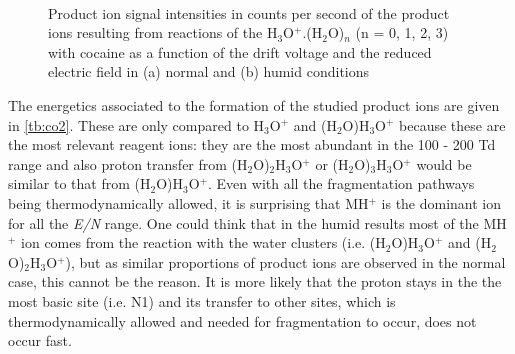  
\begin{figure}[htbp]
\centering
{}\\
\caption{Product ion signal intensities in counts per second of the product ions resulting from reactions of the H$_3$O$^+$.(H$_2$O)$_n$ (n = 0, 1, 2, 3) with cocaine as a function of the drift voltage and the reduced electric field in (a) normal and (b) humid conditions}
\label{fig:cocaineEN}
\end{figure}

The energetics associated to the formation of the studied product ions are given in \autoref{tb:co2}. 
%
These are only compared to H$_3$O$^+$ and (H$_2$O)H$_3$O$^+$ because these are the most relevant reagent ions: they are the most abundant in the 100 - 200 Td range and also proton transfer from (H$_2$O)$_2$H$_3$O$^+$ or (H$_2$O)$_3$H$_3$O$^+$ would be similar to that from (H$_2$O)H$_3$O$^+$.
%
Even with all the fragmentation pathways being thermodynamically allowed, it is surprising that MH$^+$ is the dominant ion for all the \textit{E/N} range.
%
One could think that in the humid results most of the MH$^+$ ion comes from the reaction with the water clusters (i.e. (H$_2$O)H$_3$O$^+$ and (H$_2$O)$_2$H$_3$O$^+$), but as similar proportions of product ions are observed in the normal case, this cannot be the reason.
%
It is more likely that the proton stays in the the most basic site (i.e. N1) and its transfer to other sites, which is thermodynamically allowed and needed for fragmentation to occur, does not occur fast.
%
%


